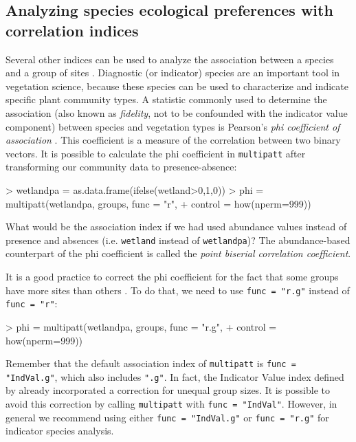 \documentclass[11pt,a4paper]{article}
\begin{document}
\subsection{Analyzing species ecological preferences with correlation indices}
Several other indices can be used to analyze the association between a species and a group of sites \citep{DeCaceres2009}. Diagnostic (or indicator) species are an important tool in vegetation science, because these species can be used to characterize and indicate specific plant community types. A statistic commonly used to determine the association (also known as \emph{fidelity}, not to be confounded with the indicator value component) between species and vegetation types is Pearson's \emph{phi coefficient of association} \citep{Chytry2002a}. This coefficient is a measure of the correlation between two binary vectors. It is possible to calculate the phi coefficient in \texttt{multipatt} after transforming our community data to presence-absence:
\begin{Schunk}
\begin{Sinput}
> wetlandpa = as.data.frame(ifelse(wetland>0,1,0))
> phi = multipatt(wetlandpa, groups, func = "r", 
+                 control = how(nperm=999)) 
\end{Sinput}
\end{Schunk}
What would be the association index if we had used abundance values instead of presence and absences (i.e. \texttt{wetland} instead of \texttt{wetlandpa})? The abundance-based counterpart of the phi coefficient is called the \emph{point biserial correlation coefficient}.

It is a good practice to correct the phi coefficient for the fact that some groups have more sites than others \citep{Tichy2006}. To do that, we need to use \texttt{func = "r.g"} instead of \texttt{func = "r"}: 
\begin{Schunk}
\begin{Sinput}
> phi = multipatt(wetlandpa, groups, func = "r.g", 
+                 control = how(nperm=999)) 
\end{Sinput}
\end{Schunk}

Remember that the default association index of \texttt{multipatt} is \texttt{func = "IndVal.g"}, which also includes \texttt{".g"}. In fact, the Indicator Value index defined by \citet{Dufrene1997} already incorporated a correction for unequal group sizes. It is possible to avoid this correction by calling \texttt{multipatt} with \texttt{func = "IndVal"}. However, in general we recommend using either \texttt{func = "IndVal.g"} or \texttt{func = "r.g"} for indicator species analysis.
\end{document}
